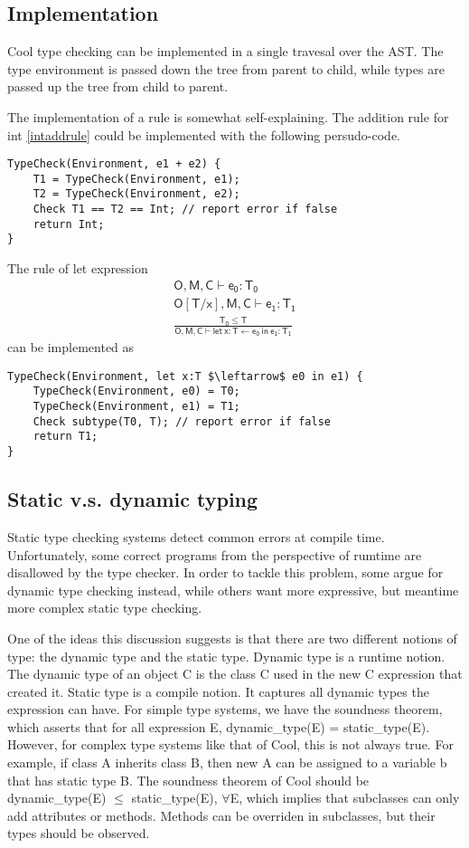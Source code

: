 \subsection{Implementation}
Cool type checking can be implemented in a single travesal over the AST. The type environment is passed down the tree from parent to child, while types are passed up the tree from child to parent.

The implementation of a rule is somewhat self-explaining. The addition rule for int \eqref{intaddrule} could be implemented with the following persudo-code.
\begin{lstlisting}
TypeCheck(Environment, e1 + e2) {
	T1 = TypeCheck(Environment, e1);
	T2 = TypeCheck(Environment, e2);
	Check T1 == T2 == Int; // report error if false
	return Int;
}
\end{lstlisting}
The rule of {\sf let} expression 
\begin{gather*}
\mathsf{O,M,C\vdash e_0:T_0}\\
\mathsf{O[T/x],M,C\vdash e_1:T_1}\\
\mathsf{\frac{T_0\leq T}{ O,M,C\vdash let\:x:T\leftarrow e_0\:in\:e_1:T_1}}
\end{gather*}
can be implemented as 
\begin{lstlisting}[mathescape = true]
TypeCheck(Environment, let x:T $\leftarrow$ e0 in e1) {
	TypeCheck(Environment, e0) = T0;
	TypeCheck(Environment, e1) = T1;
	Check subtype(T0, T); // report error if false
	return T1;
}
\end{lstlisting}
\subsection{Static v.s. dynamic typing}
Static type checking systems detect common errors at compile time. Unfortunately, some correct programs from the perspective of rumtime are disallowed by the type checker. In order to tackle this problem, some argue for dynamic type checking instead, while others want more expressive, but meantime more complex static type checking. 

One of the ideas this discussion suggests is that there are two different notions of type: the dynamic type and the static type. Dynamic type is a runtime notion. The dynamic type of an object C is the class C used in the \textsf{new C} expression that created it. Static type is a compile notion. It captures all dynamic types the expression can have. For simple type systems, we have the soundness theorem, which asserts that for all expression E, dynamic\_type(E) = static\_type(E). However, for complex type systems like that of Cool, this is not always true. For example, if class A inherits class B, then \textsf{new A} can be assigned to a variable b that has static type B. The soundness theorem of Cool should be dynamic\_type(E) $\leq$ static\_type(E), $\forall$E, which implies that subclasses can only add attributes or methods. Methods can be overriden in subclasses, but their types should be observed.
